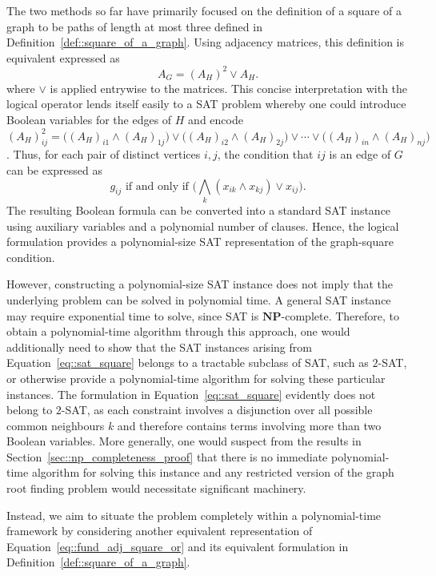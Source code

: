 \documentclass[11pt]{report}
\begin{document}
The two methods so far have primarily focused on the definition of a square of a graph to be paths of length at most three defined in Definition~\eqref{def::square_of_a_graph}. Using adjacency matrices, this definition is equivalent expressed as 
\begin{equation} \label{eq::fund_adj_square_or}
  A_G = (A_H)^2 \lor A_H.
\end{equation}
where $\lor$ is applied entrywise to the matrices. This concise interpretation with the logical operator lends itself easily to a SAT problem whereby one could introduce Boolean variables for the edges of $H$ and encode $\displaystyle (A_H)^2_{ij} = \big( (A_H)_{i1} \land (A_H)_{1j} \big) \lor \big( (A_H)_{i2} \land (A_H)_{2j} \big) \lor \cdots \lor \big( (A_H)_{in} \land (A_H)_{nj} \big)$. Thus, for each pair of distinct vertices $i,j$, the condition that $ij$ is an edge of $G$ can be expressed as
\begin{equation} \label{eq::sat_square}
  g_{ij} \text{ if and only if } \big( \bigwedge_k (x_{ik} \land x_{kj}) \lor x_{ij} \big). 
\end{equation}
The resulting Boolean formula can be converted into a standard SAT instance using auxiliary variables and a polynomial number of clauses. Hence, the logical formulation provides a polynomial-size SAT representation of the graph-square condition.

However, constructing a polynomial-size SAT instance does not imply that the underlying problem can be solved in polynomial time. A general SAT instance may require exponential time to solve, since SAT is $\mathbf{NP}$-complete. Therefore, to obtain a polynomial-time algorithm through this approach, one would additionally need to show that the SAT instances arising from Equation~\eqref{eq::sat_square} belongs to a tractable subclass of SAT, such as $2$-SAT, or otherwise provide a polynomial-time algorithm for solving these particular instances. The formulation in Equation~\eqref{eq::sat_square} evidently does not belong to $2$-SAT, as each constraint involves a disjunction over all possible common neighbours $k$ and therefore contains terms involving more than two Boolean variables. More generally, one would suspect from the results in Section~\ref{sec::np_completeness_proof} that there is no immediate polynomial-time algorithm for solving this instance and any restricted version of the graph root finding problem would necessitate significant machinery.  

Instead, we aim to situate the problem completely within a polynomial-time framework by considering another equivalent representation of Equation~\eqref{eq::fund_adj_square_or} and its equivalent formulation in Definition~\eqref{def::square_of_a_graph}.
\end{document}

